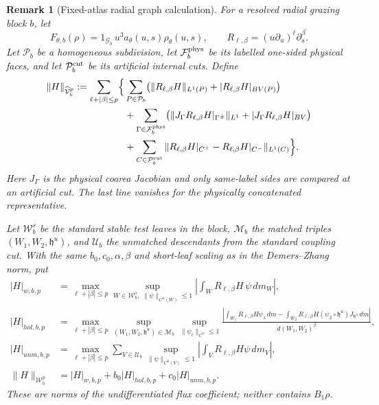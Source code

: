 \documentclass[11pt]{amsart}
\theoremstyle{compactplain}
\theoremstyle{compactdefinition}
\theoremstyle{compactremark}
\newtheorem*{remark*}{Remark}
\begin{document}
\begin{remark*}[Fixed-atlas radial graph calculation]
For a resolved radial grazing block \(b\), let
\[
 F_{\theta,b}(\rho)
 =1_{\mathcal G_b}\,u^3a_{\theta}(u,s)\rho_\theta(u,s),
 \qquad R_{\ell,\beta}=(u\partial_u)^\ell\partial_s^\beta.
\]
Let \(\mathcal P_b\) be a homogeneous subdivision, let
\(\mathcal F_b^{\rm phys}\) be its labelled one-sided physical faces, and
let \(\mathcal P_b^{\rm cut}\) be its artificial internal cuts.  Define
\begin{align*}
 \|H\|_{\widehat{\mathcal V}_b^p}
 :=\sum_{\ell+|\beta|\le p}\Bigl\{&
 \sum_{P\in\mathcal P_b}
   \bigl(\|R_{\ell,\beta}H\|_{L^1(P)}
        +|R_{\ell,\beta}H|_{BV(P)}\bigr)\\
 &+\sum_{\Gamma\in\mathcal F_b^{\rm phys}}
   \bigl(\|J_\Gamma R_{\ell,\beta}H|_{\Gamma^\pm}\|_{L^1}
        +|J_\Gamma R_{\ell,\beta}H|_{BV}\bigr)\\
 &+\sum_{C\in\mathcal P_b^{\rm cut}}
   \|R_{\ell,\beta}H|_{C^+}-R_{\ell,\beta}H|_{C^-}\|_{L^1(C)}
 \Bigr\}.
\end{align*}
Here \(J_\Gamma\) is the physical coarea Jacobian and only same-label sides
are compared at an artificial cut.  The last line vanishes for the physically
concatenated representative.

Let \(\mathcal W_b^s\) be the standard stable test leaves in the block,
\(\mathcal M_b\) the matched triples
\((W_1,W_2,\mathfrak h^u)\), and \(\mathcal U_b\) the unmatched descendants
from the standard coupling cut.  With the same
\(b_0,c_0,\alpha,\beta\) and short-leaf scaling as in the Demers--Zhang norm,
put
\begin{align*}
 |H|_{w,b,p}
 &=\max_{\ell+|\beta|\le p}
   \sup_{W\in\mathcal W_b^s,\ \|\psi\|_{C^\alpha(W)}\le1}
   \left|\int_W R_{\ell,\beta}H\,\psi\,dm_W\right|,\\
 |H|_{hol,b,p}
 &=\max_{\ell+|\beta|\le p}
   \sup_{(W_1,W_2,\mathfrak h^u)\in\mathcal M_b}
   \sup_{\|\psi_i\|_{C^\alpha}\le1}
   \frac{\left|\int_{W_1}R_{\ell,\beta}H\psi_1\,dm
    -\int_{W_2}R_{\ell,\beta}H
      (\psi_2\circ\mathfrak h^u)J_{\mathfrak h^u}\,dm\right|}
        {d(W_1,W_2)^\beta},\\
 |H|_{unm,b,p}
 &=\max_{\ell+|\beta|\le p}
   \sum_{V\in\mathcal U_b}
   \sup_{\|\psi\|_{C^0(V)}\le1}
   \left|\int_VR_{\ell,\beta}H\psi\,dm_V\right|,\\
 \|H\|_{\mathcal W_b^p}&=|H|_{w,b,p}+b_0|H|_{hol,b,p}
   +c_0|H|_{unm,b,p}.
\end{align*}
These are norms of the undifferentiated flux coefficient; neither contains
\(B_1\rho\).


\end{remark*}
\end{document}
